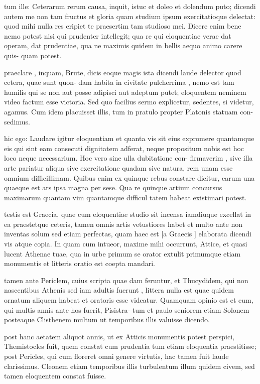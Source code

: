  tum ille: Ceterarum rerum causa, inquit, istuc et doleo et dolendum puto; dicendi autem me non tam fructus et gloria quam studium ipsum exercitatioque delectat: quod mihi nulla res eripiet te praesertim tam studioso mei. Dicere enim bene nemo potest nisi qui prudenter intellegit; qua re qui eloquentiae verae dat operam, dat prudentiae, qua ne maximis quidem in bellis aequo animo carere quis- quam potest.

 praeclare , inquam, Brute, dicis eoque magis ista dicendi laude delector quod cetera, quae sunt quon- dam habita in civitate pulcherrima , nemo est tam humilis qui se non aut posse adipisci aut adeptum putet; eloquentem neminem video factum esse victoria. Sed quo facilius sermo explicetur, sedentes, si videtur, agamus. Cum idem placuisset illis, tum in pratulo propter Platonis statuam con- sedimus.

 hic ego: Laudare igitur eloquentiam et quanta vis sit eius expromere quantamque eis qui sint eam consecuti dignitatem adferat, neque propositum nobis est hoc loco neque necessarium. Hoc vero sine ulla dubitatione con- firmaverim , sive illa arte pariatur aliqua sive exercitatione quadam sive natura, rem unam esse omnium difficillimam. Quibus enim ex quinque rebus constare dicitur, earum una quaeque est ars ipsa magna per sese. Qua re quinque artium concursus maximarum quantam vim quantamque difficul tatem habeat existimari potest.

 testis est Graecia, quae cum eloquentiae studio sit incensa iamdiuque excellat in ea praestetque ceteris, tamen omnis artis vetustiores habet et multo ante non inventas solum sed etiam perfectas, quam haec est [a Graecis ] elaborata dicendi vis atque copia. In quam cum intueor, maxime mihi occurrunt, Attice, et quasi lucent Athenae tuae, qua in urbe primum se orator extulit primumque etiam monumentis et litteris oratio est coepta mandari.

 tamen ante Periclem, cuius scripta quae dam feruntur, et Thucydidem, qui non nascentibus Athenis sed iam adultis fuerunt , littera nulla est quae quidem ornatum aliquem habeat et oratoris esse videatur. Quamquam opinio est et eum, qui multis annis ante hos fuerit, Pisistra- tum et paulo seniorem etiam Solonem posteaque Clisthenem multum ut temporibus illis valuisse dicendo.

 post hanc aetatem aliquot annis, ut ex Atticis monumentis potest perspici, Themistocles fuit, quem constat cum prudentia tum etiam eloquentia praestitisse; post Pericles, qui cum floreret omni genere virtutis, hac tamen fuit laude clarissimus. Cleonem etiam temporibus illis turbulentum illum quidem civem, sed tamen eloquentem constat fuisse.

